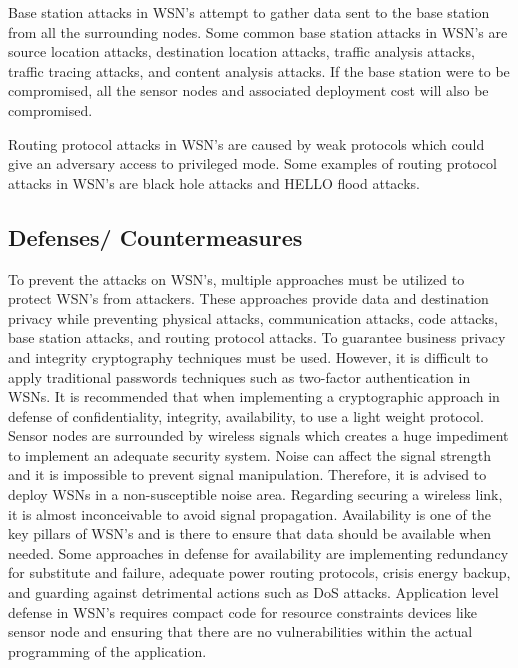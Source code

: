 Base station attacks in WSN’s attempt to gather data sent to the base station from all the surrounding nodes. Some common base station attacks in WSN’s are source location attacks, destination location attacks, traffic analysis attacks, traffic tracing attacks, and content analysis attacks. If the base station were to be compromised, all the sensor nodes and associated deployment cost will also be compromised. 

\smallskip

Routing protocol attacks in WSN’s are caused by weak protocols which could give an adversary access to privileged mode. Some examples of routing protocol attacks in WSN’s are black hole attacks and HELLO flood attacks.

\subsection {Defenses/ Countermeasures}
\smallskip

To prevent the attacks on WSN’s, multiple approaches must be utilized to protect WSN’s from attackers. These approaches provide data and destination privacy while preventing physical attacks, communication attacks, code attacks, base station attacks, and routing protocol attacks. To guarantee business privacy and integrity cryptography techniques must be used. However, it is difficult to apply traditional passwords techniques such as two-factor authentication in WSNs. It is recommended that when implementing a cryptographic approach in defense of confidentiality, integrity, availability, to use a light weight protocol. Sensor nodes are surrounded by wireless signals which creates a huge impediment to implement an adequate security system. Noise can affect the signal strength and it is impossible to prevent signal manipulation. Therefore, it is advised to deploy WSNs in a non-susceptible noise area. Regarding securing a wireless link, it is almost inconceivable to avoid signal propagation. Availability is one of the key pillars of WSN’s and is there to ensure that data should be available when needed. Some approaches in defense for availability are implementing redundancy for substitute and failure, adequate power routing protocols, crisis energy backup, and guarding against detrimental actions such as DoS attacks. Application level defense in WSN’s requires compact code for resource constraints devices like sensor node and ensuring that there are no vulnerabilities within the actual programming of the application. 

